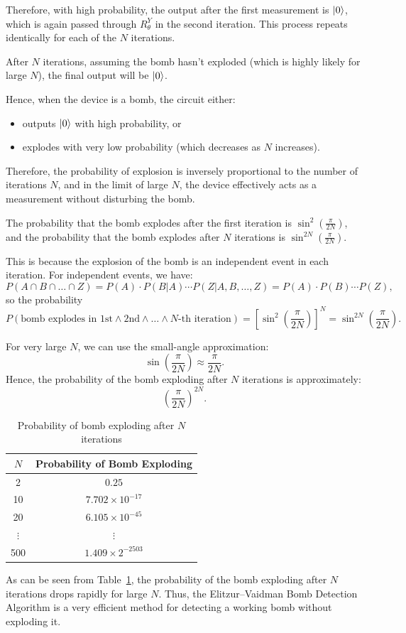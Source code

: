 \begin{itemize}
    Therefore, with high probability, the output after the first measurement is $\ket{0}$, which is again passed through $R^Y_{\theta}$ in the second iteration. This process repeats identically for each of the $N$ iterations.

    After $N$ iterations, assuming the bomb hasn’t exploded (which is highly likely for large $N$), the final output will be $\ket{0}$.

    Hence, when the device is a bomb, the circuit either:
    \begin{itemize}
        \item outputs $\ket{0}$ with high probability, or
        \item explodes with very low probability (which decreases as $N$ increases).
    \end{itemize}

    Therefore, the probability of explosion is inversely proportional to the number of iterations $N$, and in the limit of large $N$, the device effectively acts as a measurement without disturbing the bomb.
\end{itemize}

    The probability that the bomb explodes after the first iteration is $\sin^2 \left( \frac{\pi}{2N} \right)$, and the probability that the bomb explodes after $N$ iterations is $\sin^{2N} \left( \frac{\pi}{2N} \right)$. 

This is because the explosion of the bomb is an independent event in each iteration. For independent events, we have:
\[
P(A \cap B \cap \ldots \cap Z) = P(A) \cdot P(B|A) \cdots P(Z|A,B,\ldots,Z) = P(A) \cdot P(B) \cdots P(Z),
\]
so the probability 
\[
P(\text{bomb explodes in 1st} \land \text{2nd} \land \ldots \land \text{$N$-th iteration}) = \left[\sin^2\left( \frac{\pi}{2N} \right)\right]^N = \sin^{2N}\left( \frac{\pi}{2N} \right).
\]

For very large $N$, we can use the small-angle approximation:
\[
\sin\left( \frac{\pi}{2N} \right) \approx \frac{\pi}{2N}.
\]
Hence, the probability of the bomb exploding after $N$ iterations is approximately:
\[
\left( \frac{\pi}{2N} \right)^{2N}.
\]

\begin{table}[ht]
    \centering
    \begin{tabular}{|c|c|}
        \hline
        $N$ & Probability of Bomb Exploding \\
        \hline
        2 & $0.25$ \\
        10 & $7.702 \times 10^{-17}$  \\
        20 & $6.105 \times 10^{-45}$ \\
        $\vdots$ & $\vdots$ \\
        500 & $1.409 \times 2^{-2503}$ \\
        \hline
    \end{tabular}
    \caption{Probability of bomb exploding after $N$ iterations}
    \label{tab:Prob}
\end{table}

As can be seen from Table~\ref{tab:Prob}, the probability of the bomb exploding after $N$ iterations drops rapidly for large $N$. Thus, the Elitzur–Vaidman Bomb Detection Algorithm is a very efficient method for detecting a working bomb without exploding it.







\chapterreferences
